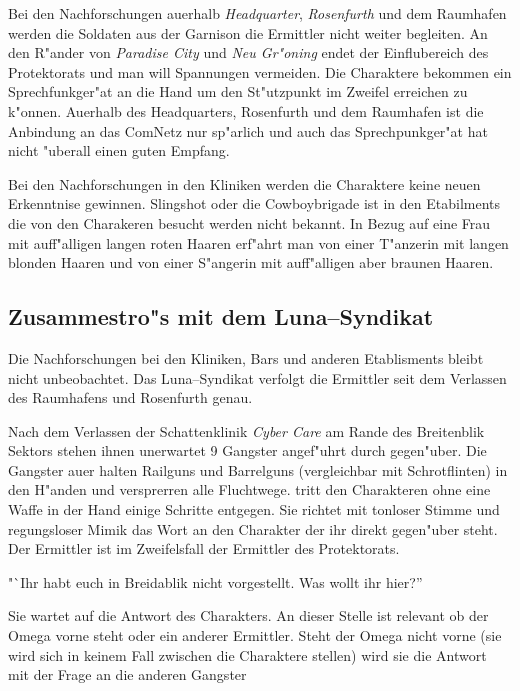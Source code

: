 Bei den Nachforschungen au\3erhalb \emph{Headquarter}, \emph{Rosenfurth} und dem Raumhafen werden die Soldaten aus der Garnison die Ermittler nicht weiter begleiten. An den R"ander von \emph{Paradise City} und \emph{Neu Gr"oning} endet der Einflu\3bereich des Protektorats und man will Spannungen vermeiden. Die Charaktere bekommen ein Sprechfunkger"at an die Hand um den St"utzpunkt im Zweifel erreichen zu k"onnen. Au\3erhalb des Headquarters, Rosenfurth und dem Raumhafen ist die Anbindung an das ComNetz nur sp"arlich und auch das Sprechpunkger"at hat nicht "uberall einen guten Empfang.

Bei den Nachforschungen in den Kliniken werden die Charaktere keine neuen Erkenntnise gewinnen. Slingshot oder die Cowboybrigade ist in den Etabilments die von den Charakeren besucht werden nicht bekannt. In Bezug auf eine Frau mit auff"alligen langen roten Haaren erf"ahrt man von einer T"anzerin mit langen blonden Haaren und von einer S"angerin mit auff"alligen aber braunen Haaren.


\subsection{Zusammestro"s mit dem Luna--Syndikat}
\newcommand{\xl}{\pinyin{Xiao3} \pinyin{Long2}}

Die Nachforschungen bei den Kliniken, Bars und anderen Etablisments bleibt nicht unbeobachtet. Das Luna--Syndikat verfolgt die Ermittler seit dem Verlassen des Raumhafens und Rosenfurth genau.

Nach dem Verlassen der Schattenklinik \emph{ Cyber Care} am Rande des Breitenblik Sektors stehen ihnen unerwartet 9 Gangster angef"uhrt durch \xl{} gegen"uber. Die Gangster au\3er \xl{} halten  Railguns und Barrelguns (vergleichbar mit Schrotflinten) in den H"anden und versprerren alle Fluchtwege. \xl{} tritt den Charakteren ohne eine Waffe in der Hand einige Schritte entgegen. Sie richtet mit tonloser Stimme und regungsloser Mimik das Wort an den Charakter der ihr direkt gegen"uber steht. Der Ermittler ist im Zweifelsfall der Ermittler des Protektorats. 

"`Ihr habt euch in Breidablik nicht vorgestellt. Was wollt ihr hier?''

Sie wartet auf die Antwort des Charakters. An dieser Stelle ist relevant ob der Omega vorne steht oder ein anderer Ermittler. Steht der Omega nicht vorne (sie wird sich in keinem Fall zwischen die Charaktere stellen) wird sie die Antwort mit der Frage an die anderen Gangster

